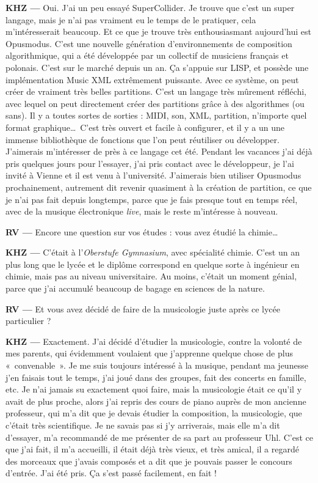 \documentclass[a4paper,12pt]{article}
\newcommand{\guill}[1]{«~#1~»}
\begin{document}
\textbf{KHZ ---} Oui. J'ai un peu essayé SuperCollider. Je trouve que c'est un super langage, mais je n'ai pas vraiment eu le temps de le pratiquer, cela m'intéresserait beaucoup. Et ce que je trouve très enthousiasmant aujourd'hui est Opusmodus. C'est une nouvelle génération d'environnements de composition algorithmique, qui a été développée par un collectif de musiciens français et polonais. C'est sur le marché depuis un an. Ça s'appuie sur LISP, et possède une implémentation Music XML extrêmement puissante. Avec ce système, on peut créer de vraiment très belles partitions. C'est un langage très mûrement réfléchi, avec lequel on peut directement créer des partitions grâce à des algorithmes (ou sans). Il y a toutes sortes de sorties : MIDI, son, XML, partition, n'importe quel format graphique\dots~C'est très ouvert et facile à configurer, et il y a un une immense bibliothèque de fonctions que l'on peut réutiliser ou développer. J'aimerais m'intéresser de près à ce langage cet été. Pendant les vacances j'ai déjà pris quelques jours pour l'essayer, j'ai pris contact avec le développeur, je l'ai invité à Vienne et il est venu à l'université. J'aimerais bien utiliser Opusmodus prochainement, autrement dit revenir quasiment à la création de partition, ce que je n'ai pas fait depuis longtemps, parce que je fais presque tout en temps réel, avec de la musique électronique \emph{live}, mais le reste m'intéresse à nouveau.

\textbf{RV ---} Encore une question sur vos études : vous avez étudié la chimie\dots

\textbf{KHZ ---} C'était à l'\emph{Oberstufe Gymnasium}, avec spécialité chimie. C'est un an plus long que le lycée et le diplôme correspond en quelque sorte à ingénieur en chimie, mais pas au niveau universitaire. Au moins, c'était un moment génial, parce que j'ai accumulé beaucoup de bagage en sciences de la nature.

\textbf{RV ---} Et vous avez décidé de faire de la musicologie juste après ce lycée particulier ?

\textbf{KHZ ---} Exactement. J'ai décidé d'étudier la musicologie, contre la volonté de mes parents, qui évidemment voulaient que j'apprenne quelque chose de plus \guill{convenable}. Je me suis toujours intéressé à la musique, pendant ma jeunesse j'en faisais tout le temps, j'ai joué dans des groupes, fait des concerts en famille, etc. Je n'ai jamais su exactement quoi faire, mais la musicologie était ce qu'il y avait de plus proche, alors j'ai repris des cours de piano auprès de mon ancienne professeur, qui m'a dit que je devais étudier la composition, la musicologie, que c'était très scientifique. Je ne savais pas si j'y arriverais, mais elle m'a dit d'essayer, m'a recommandé de me présenter de sa part au professeur Uhl. C'est ce que j'ai fait, il m'a accueilli, il était déjà très vieux, et très amical, il a regardé des morceaux que j'avais composés et a dit que je pouvais passer le concours d'entrée. J'ai été pris. Ça s'est passé facilement, en fait !
\end{document}
